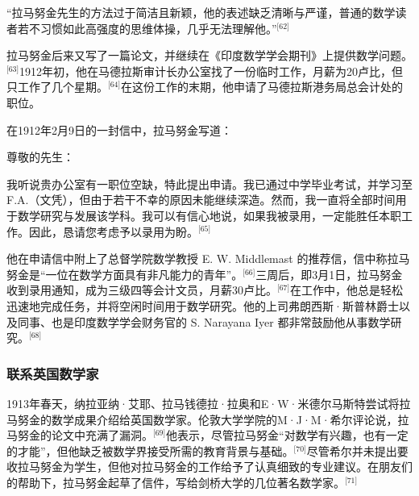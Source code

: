 “拉马努金先生的方法过于简洁且新颖，他的表述缺乏清晰与严谨，普通的数学读者若不习惯如此高强度的思维体操，几乎无法理解他。”\(^\text{[62]}\)

拉马努金后来又写了一篇论文，并继续在《印度数学学会期刊》上提供数学问题。\(^\text{[63]}\)1912年初，他在马德拉斯审计长办公室找了一份临时工作，月薪为20卢比，但只工作了几个星期。\(^\text{[64]}\)在这份工作的末期，他申请了马德拉斯港务局总会计处的职位。

在1912年2月9日的一封信中，拉马努金写道：

尊敬的先生：

我听说贵办公室有一职位空缺，特此提出申请。我已通过中学毕业考试，并学习至F.A.（文凭），但由于若干不幸的原因未能继续深造。然而，我一直将全部时间用于数学研究与发展该学科。我可以有信心地说，如果我被录用，一定能胜任本职工作。因此，恳请您考虑予以录用为盼。\(^\text{[65]}\)

他在申请信中附上了总督学院数学教授 E. W. Middlemast 的推荐信，信中称拉马努金是“一位在数学方面具有非凡能力的青年”。\(^\text{[66]}\)三周后，即3月1日，拉马努金收到录用通知，成为三级四等会计文员，月薪30卢比。\(^\text{[67]}\)在工作中，他总是轻松迅速地完成任务，并将空闲时间用于数学研究。他的上司弗朗西斯·斯普林爵士以及同事、也是印度数学学会财务官的 S. Narayana Iyer 都非常鼓励他从事数学研究。\(^\text{[68]}\)
\subsubsection{联系英国数学家}
1913年春天，纳拉亚纳·艾耶、拉马钱德拉·拉奥和E·W·米德尔马斯特尝试将拉马努金的数学成果介绍给英国数学家。伦敦大学学院的M·J·M·希尔评论说，拉马努金的论文中充满了漏洞。\(^\text{[69]}\)他表示，尽管拉马努金“对数学有兴趣，也有一定的才能”，但他缺乏被数学界接受所需的教育背景与基础。\(^\text{[70]}\)尽管希尔并未提出要收拉马努金为学生，但他对拉马努金的工作给予了认真细致的专业建议。在朋友们的帮助下，拉马努金起草了信件，写给剑桥大学的几位著名数学家。\(^\text{[71]}\)

